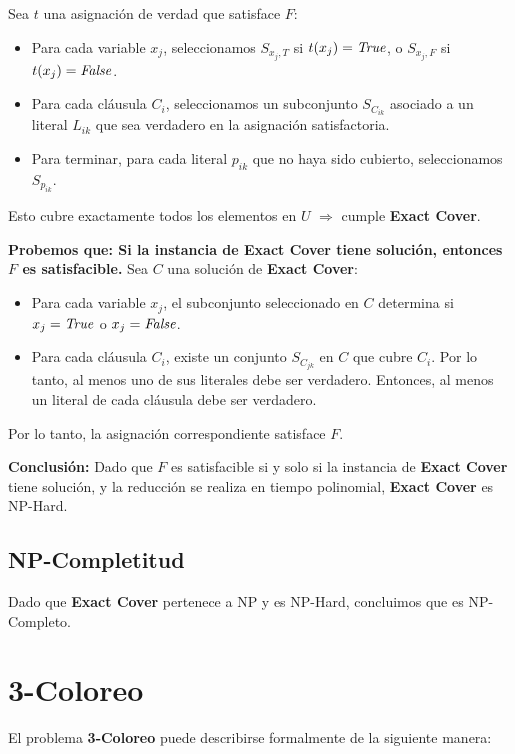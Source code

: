 \documentclass[a4paper,12pt]{article}
\begin{document}
Sea $t$ una asignación de verdad que satisface $F$:
\begin{itemize}
    \item Para cada variable $x_j$, seleccionamos $S_{x_j,T}$ si $t(x_j) = \text{\textit{True}}$, o $S_{x_j,F}$ si $t(x_j) = \text{\textit{False}}$.
    \item Para cada cláusula $C_i$, seleccionamos un subconjunto $S_{C_{ik}}$ asociado a un literal $L_{ik}$ que sea verdadero en la asignación satisfactoria.
    \item Para terminar, para cada literal $p_{ik}$ que no haya sido cubierto, seleccionamos $S_{p_{ik}}$.
\end{itemize}
Esto cubre exactamente todos los elementos en $U$ $\Rightarrow$ cumple \textbf{Exact Cover}.

\textbf{Probemos que: Si la instancia de \textbf{Exact Cover} tiene solución, entonces $F$ es satisfacible.}
Sea $C$ una solución de \textbf{Exact Cover}:
\begin{itemize}
    \item Para cada variable $x_j$, el subconjunto seleccionado en $C$ determina si $x_j = \text{\textit{True}}$ o $x_j = \text{\textit{False}}$.
    \item Para cada cláusula $C_i$, existe un conjunto $S_{C_{jk}}$ en $C$ que cubre $C_i$. Por lo tanto, al menos uno de sus literales debe ser verdadero. Entonces, al menos un literal de cada cláusula debe ser verdadero.
\end{itemize}
Por lo tanto, la asignación correspondiente satisface $F$.

\textbf{Conclusión:} Dado que $F$ es satisfacible si y solo si la instancia de \textbf{Exact Cover} tiene solución, y la reducción se realiza en tiempo polinomial, \textbf{Exact Cover} es NP-Hard.

\subsection{NP-Completitud}
Dado que \textbf{Exact Cover} pertenece a NP y es NP-Hard, concluimos que es NP-Completo.





\section{3-Coloreo}

El problema \textbf{3-Coloreo} puede describirse formalmente de la siguiente manera:
\end{document}
